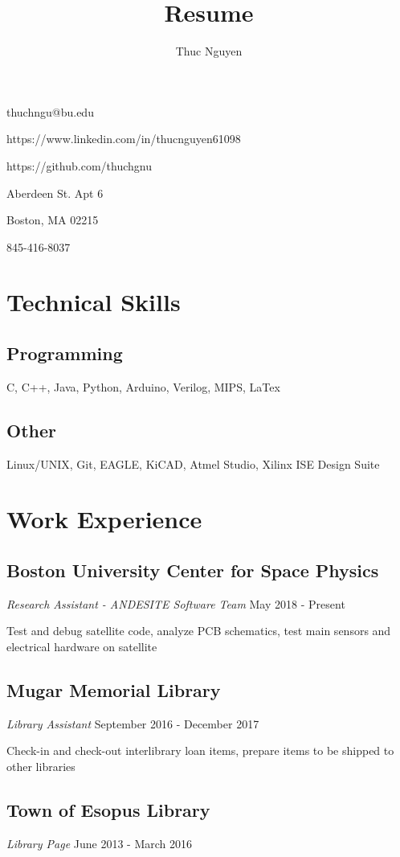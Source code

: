 \documentclass{article}
\makeatletter
\renewcommand{\maketitle}
{\begin{center}
{\huge\bfseries\theauthor}
\vspace{.5em}

thuchngu@bu.edu

https://www.linkedin.com/in/thucnguyen61098

https://github.com/thuchgnu

\end{center}}
\makeatother
\begin{document}
\title{Resume}
\author{Thuc Nguyen}
\maketitle
\vspace{-.5em}
{ Aberdeen St. Apt 6

Boston, MA 02215

845-416-8037

}

\vspace{.5em}






\section{Technical Skills}
\subsection{Programming}
C, C++, Java, Python, Arduino, Verilog, MIPS, LaTex
\subsection{Other}
Linux/UNIX, Git, EAGLE, KiCAD, Atmel Studio, Xilinx ISE Design Suite

\section{Work Experience}
\subsection{Boston University Center for Space Physics}  \textit{Research Assistant - ANDESITE Software Team}
May 2018 - Present

Test and debug satellite code, analyze PCB schematics, test main sensors and electrical hardware on satellite
\subsection{Mugar Memorial Library} \textit{Library Assistant}
September 2016 - December 2017

Check-in and check-out interlibrary loan items, prepare items to be shipped to other libraries
\subsection{Town of Esopus Library} \textit{Library Page}
June 2013 - March 2016
\end{document}
